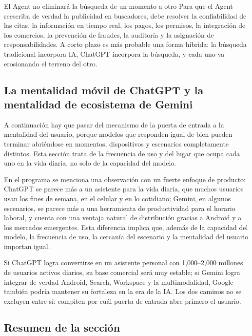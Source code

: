 \documentclass[a4paper]{article}
\begin{document}
\begin{warningbox}{El Agent no eliminará la búsqueda de un momento a otro}
Para que el Agent reescriba de verdad la publicidad en buscadores, debe resolver la confiabilidad de las citas, la información en tiempo real, los pagos, los permisos, la integración de los comercios, la prevención de fraudes, la auditoría y la asignación de responsabilidades. A corto plazo es más probable una forma híbrida: la búsqueda tradicional incorpora IA, ChatGPT incorpora la búsqueda, y cada uno va erosionando el terreno del otro.
\end{warningbox}

\subsection{La mentalidad móvil de ChatGPT y la mentalidad de ecosistema de Gemini}

A continuación hay que pasar del mecanismo de la puerta de entrada a la mentalidad del usuario, porque modelos que responden igual de bien pueden terminar abriéndose en momentos, dispositivos y escenarios completamente distintos. Esta sección trata de la frecuencia de uso y del lugar que ocupa cada uno en la vida diaria, no solo de la capacidad del modelo.

En el programa se menciona una observación con un fuerte enfoque de producto: ChatGPT se parece más a un asistente para la vida diaria, que muchos usuarios usan los fines de semana, en el celular y en lo cotidiano; Gemini, en algunos escenarios, se parece más a una herramienta de productividad para el horario laboral, y cuenta con una ventaja natural de distribución gracias a Android y a los mercados emergentes. Esta diferencia implica que, además de la capacidad del modelo, la frecuencia de uso, la cercanía del escenario y la mentalidad del usuario importan igual.

Si ChatGPT logra convertirse en un asistente personal con 1,000--2,000 millones de usuarios activos diarios, su base comercial será muy estable; si Gemini logra integrar de verdad Android, Search, Workspace y la multimodalidad, Google también podría mantener su fortaleza en la era de la IA. Los dos caminos no se excluyen entre sí: compiten por cuál puerta de entrada abre primero el usuario.

\subsection{Resumen de la sección}
\end{document}
